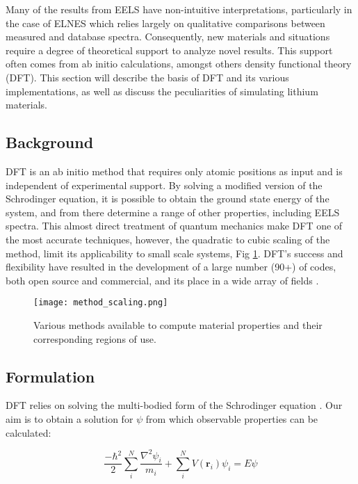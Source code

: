 

 


Many of the results from EELS have non-intuitive interpretations, particularly in the case of ELNES which relies largely on qualitative comparisons between measured and database spectra.  Consequently, new materials and situations require a degree of theoretical support to analyze novel results.  This support often comes from ab initio calculations, amongst others density functional theory (DFT).  This section will describe the basis of DFT and its various implementations, as well as discuss the peculiarities of simulating lithium materials.

\subsection{Background}
DFT is an ab initio method that requires only atomic positions as input and is independent of experimental support.  By solving a modified version of the Schrodinger equation, it is possible to obtain the ground state energy of the system, and from there determine a range of other properties, including EELS spectra. This almost direct treatment of quantum mechanics make DFT one of the most accurate techniques, however, the quadratic to cubic scaling of the method, limit its applicability to small scale systems, Fig \ref{scaling}.  DFT's success and flexibility have resulted in the development of a large number (90+) of codes, both open source and commercial, and its place in a wide array of fields \cite{DFT_codes}.  

\begin{figure}
	\centering
	\texttt{[image: method\_scaling.png]}
	\caption{Various methods available to compute material properties and their corresponding regions of use. }
	\label{scaling}
\end{figure}


\subsection{Formulation}

DFT relies on solving the multi-bodied form of the Schrodinger equation \cite{sholl_density_2009}.  Our aim is to obtain a solution for $\psi$ from which observable properties can be calculated:  

\begin{equation}
	\frac{-\hbar^2}{2} \sum_{i}^{N} \frac{\nabla^2 \psi_i}{m_i} + \sum_{i}^{N} V(\textbf{r}_i) \psi_i = E \psi
\end{equation}

